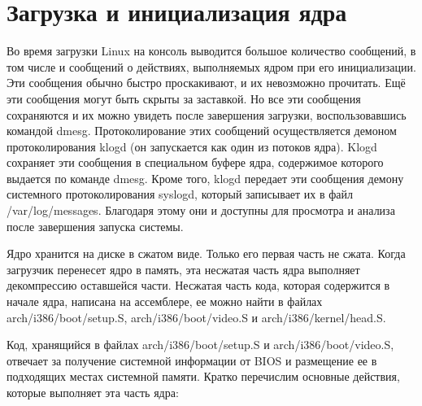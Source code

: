 \section{Загрузка и инициализация ядра}

Во время загрузки Linux на консоль выводится большое количество сообщений, в том числе и сообщений о действиях, выполняемых ядром при его инициализации. Эти сообщения обычно быстро проскакивают, и их невозможно прочитать. Ещё эти сообщения могут быть скрыты за заставкой. Но все эти сообщения сохраняются и их можно увидеть после завершения загрузки, воспользовавшись командой dmesg. Протоколирование этих сообщений осуществляется демоном протоколирования klogd (он запускается как один из потоков ядра). Klogd сохраняет эти сообщения в специальном буфере ядра, содержимое которого выдается по команде dmesg. Кроме того, klogd передает эти сообщения демону системного протоколирования syslogd, который записывает их в файл /var/log/messages. Благодаря этому они и доступны для просмотра и анализа после завершения запуска системы.

Ядро хранится на диске в сжатом виде. Только его первая часть не сжата. Когда загрузчик перенесет ядро в память, эта несжатая часть ядра выполняет декомпрессию оставшейся части. Несжатая часть кода, которая содержится в начале ядра, написана на ассемблере, ее можно найти в файлах arch/i386/boot/setup.S, arch/i386/boot/video.S и arch/i386/kernel/head.S.

Код, хранящийся в файлах arch/i386/boot/setup.S и arch/i386/boot/video.S, отвечает за получение системной информации от BIOS и размещение ее в подходящих местах системной памяти. Кратко перечислим основные действия, которые выполняет эта часть ядра:

